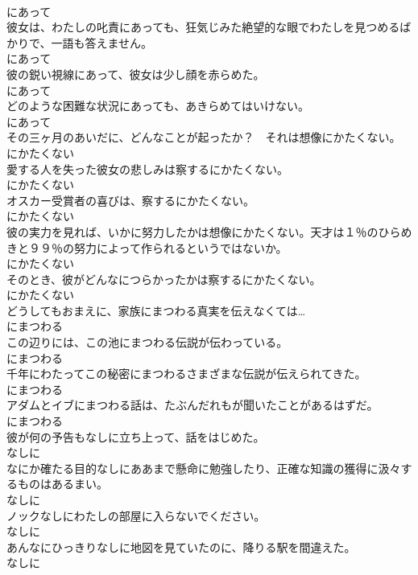 \documentclass[8pt]{extreport}
\begin{document}
\begin{CJK}{UTF8}{min}
\\	にあって
\\	彼女は、わたしの叱責にあっても、狂気じみた絶望的な眼でわたしを見つめるばかりで、一語も答えません。	
\\	にあって
\\	彼の鋭い視線にあって、彼女は少し顔を赤らめた。	
\\	にあって
\\	どのような困難な状況にあっても、あきらめてはいけない。	
\\	にあって
\\	その三ヶ月のあいだに、どんなことが起ったか？　それは想像にかたくない。	
\\	にかたくない
\\	愛する人を失った彼女の悲しみは察するにかたくない。	
\\	にかたくない
\\	オスカー受賞者の喜びは、察するにかたくない。	
\\	にかたくない
\\	彼の実力を見れば、いかに努力したかは想像にかたくない。天才は１％のひらめきと９９％の努力によって作られるというではないか。	
\\	にかたくない
\\	そのとき、彼がどんなにつらかったかは察するにかたくない。	
\\	にかたくない
\\	どうしてもおまえに、家族にまつわる真実を伝えなくては…	
\\	にまつわる
\\	この辺りには、この池にまつわる伝説が伝わっている。	
\\	にまつわる
\\	千年にわたってこの秘密にまつわるさまざまな伝説が伝えられてきた。	
\\	にまつわる
\\	アダムとイブにまつわる話は、たぶんだれもが聞いたことがあるはずだ。	
\\	にまつわる
\\	彼が何の予告もなしに立ち上って、話をはじめた。	
\\	なしに
\\	なにか確たる目的なしにああまで懸命に勉強したり、正確な知識の獲得に汲々するものはあるまい。	
\\	なしに
\\	ノックなしにわたしの部屋に入らないでください。	
\\	なしに
\\	あんなにひっきりなしに地図を見ていたのに、降りる駅を間違えた。	
\\	なしに

\end{CJK}
\end{document}
